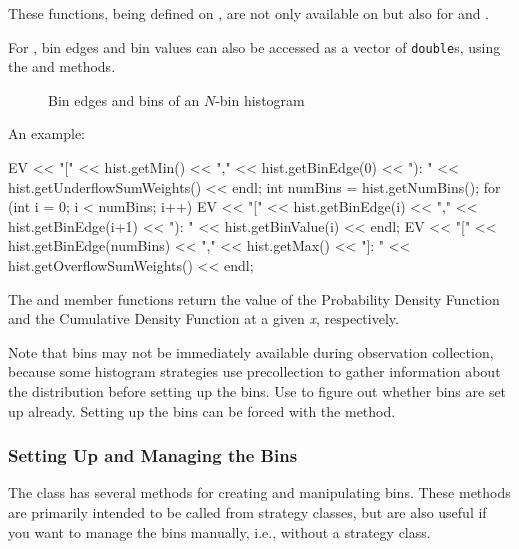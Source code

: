 These functions, being defined on , are not only
available on  but also for  and .

For , bin edges and bin values can also be accessed
as a vector of \texttt{double}s, using the  and
 methods.

\begin{figure}[htbp]
  \begin{center}
    
    \caption{Bin edges and bins of an $N$-bin histogram}
  \end{center}
\end{figure}

An example:

\begin{cpp}
EV << "[" << hist.getMin() << "," << hist.getBinEdge(0) << "): "
   << hist.getUnderflowSumWeights() << endl;
int numBins = hist.getNumBins();
for (int i = 0; i < numBins; i++) {
  EV << "[" << hist.getBinEdge(i) << "," << hist.getBinEdge(i+1) << "): "
     << hist.getBinValue(i) << endl;
}
EV << "[" << hist.getBinEdge(numBins) << "," << hist.getMax() << "]: "
   << hist.getOverflowSumWeights() << endl;
\end{cpp}

The  and  member functions
return the value of the Probability Density Function and the Cumulative
Density Function at a given \textit{x}, respectively.

Note that bins may not be immediately available during observation
collection, because some histogram strategies use precollection
to gather information about the distribution before setting up the bins.
Use  to figure out whether bins are
set up already. Setting up the bins can be forced with the
 method.


\subsubsection{Setting Up and Managing the Bins}
\label{sec:sim-lib:setting-up-bins}

The  class has several methods for creating and
manipulating bins. These methods are primarily intended to be called
from strategy classes, but are also useful if you want to manage
the bins manually, i.e., without a strategy class.

